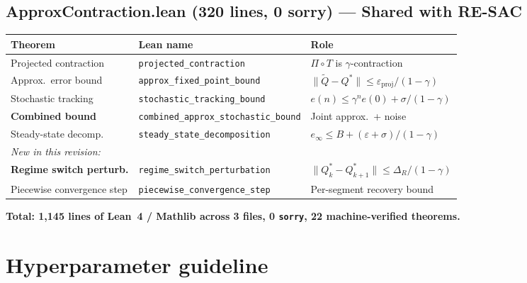 \subsection{ApproxContraction.lean (320 lines, \textbf{0 sorry}) --- Shared with RE-SAC}
\begin{center}
\begin{tabular}{lll}
\toprule
\textbf{Theorem} & \textbf{Lean name} & \textbf{Role} \\
\midrule
Projected contraction & \texttt{projected\_contraction} & $\Pi \circ T$ is $\gamma$-contraction \\
Approx.\ error bound & \texttt{approx\_fixed\_point\_bound} & $\|\tilde{Q} - Q^*\| \leq \varepsilon_{\text{proj}}/(1-\gamma)$ \\
Stochastic tracking & \texttt{stochastic\_tracking\_bound} & $e(n) \leq \gamma^n e(0) + \sigma/(1-\gamma)$ \\
\textbf{Combined bound} & \texttt{combined\_approx\_stochastic\_bound} & Joint approx.\ + noise \\
Steady-state decomp. & \texttt{steady\_state\_decomposition} & $e_\infty \leq B + (\varepsilon + \sigma)/(1-\gamma)$ \\
\midrule
\multicolumn{3}{l}{\textit{New in this revision:}} \\
\textbf{Regime switch perturb.} & \texttt{regime\_switch\_perturbation} & $\|Q^*_k - Q^*_{k+1}\| \leq \Delta_R/(1-\gamma)$ \\
Piecewise convergence step & \texttt{piecewise\_convergence\_step} & Per-segment recovery bound \\
\bottomrule
\end{tabular}
\end{center}

\medskip
\noindent\textbf{Total: 1,145 lines of Lean~4 / Mathlib across 3 files, 0 \texttt{sorry}, 22 machine-verified theorems.}


\section{Hyperparameter guideline}
\label{app:hyperparams}

